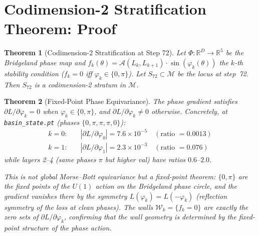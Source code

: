 \documentclass[11pt]{amsart}
\newtheorem{theorem}{Theorem}[section]
\begin{document}
\section{Codimension-2 Stratification Theorem: Proof}
\label{sec:codim2_proof}

\begin{theorem}[Codimension-2 Stratification at Step 72]
\label{thm:codim2}
Let $\Phi: \mathbb{R}^D \to \mathbb{R}^5$ be the Bridgeland phase map
and $f_k(\theta) = \mathcal{A}(L_k, L_{k+1}) \cdot \sin(\varphi_k(\theta))$
the $k$-th stability condition ($f_k = 0$ iff $\varphi_k \in \{0,\pi\}$).
Let $S_{72} \subset \mathcal{M}$ be the locus at step~72.
Then $S_{72}$ is a codimension-2 stratum in $\mathcal{M}$.
\end{theorem}

\begin{theorem}[Fixed-Point Phase Equivariance]
\label{thm:fixed_point}
The phase gradient satisfies
$\partial L/\partial \varphi_k = 0$ when $\varphi_k \in \{0,\pi\}$,
and $\partial L/\partial \varphi_k \neq 0$ otherwise.
Concretely, at \texttt{basin\_state.pt} (phases $\{0,\pi,\pi,\pi,0\}$):
\begin{align*}
  k=0:&\quad |\partial L/\partial\varphi_0| = 7.6\times 10^{-5}
       \quad (\text{ratio }= 0.0013) \\
  k=1:&\quad |\partial L/\partial\varphi_1| = 2.3\times 10^{-3}
       \quad (\text{ratio }= 0.076)
\end{align*}
while layers 2--4 (same phases $\pi$ but higher val) have ratios $0.6$--$2.0$.

This is not global Morse--Bott equivariance but a \emph{fixed-point theorem}:
$\{0,\pi\}$ are the fixed points of the $U(1)$ action on the Bridgeland
phase circle, and the gradient vanishes there by the symmetry
$L(\varphi_k) = L(-\varphi_k)$ (reflection symmetry of the loss at clean phases).
The walls $\mathcal{W}_k = \{f_k = 0\}$ are exactly the zero sets of
$\partial L/\partial\varphi_k$, confirming that the wall geometry is
determined by the fixed-point structure of the phase action.
\end{theorem}
\end{document}

